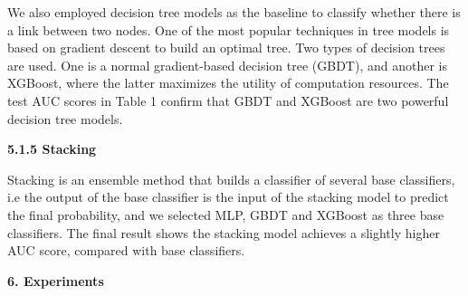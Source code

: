 \documentclass[12pt]{article}
\renewcommand{\_}{\kern-1.5pt\textunderscore\kern-1.5pt}
\begin{document}
\begin{justify}
We also employed decision tree models as the baseline to classify whether there is a link between two nodes. One of the most popular techniques in tree models is based on gradient descent to build an optimal tree. Two types of decision trees are used. One is a normal gradient-based decision tree (GBDT), and another is XGBoost, where the latter maximizes the utility of computation resources. The test AUC scores in Table 1 confirm that GBDT and XGBoost are two powerful decision tree models.
\end{justify}
\begin{justify}
\textbf{5.1.5 Stacking}
\end{justify}
\begin{justify}
Stacking is an ensemble method that builds a classifier of several base classifiers, i.e the output of the base classifier is the input of the stacking model to predict the final probability, and we selected MLP, GBDT and XGBoost as three base classifiers. The final result shows the stacking model achieves a slightly higher AUC score, compared with base classifiers.
\end{justify}
\begin{justify}
{\fontsize{13pt}{15.6pt}\selectfont \textbf{6. Experiments}}
\end{justify}

\vspace{\baselineskip}


\end{document}
